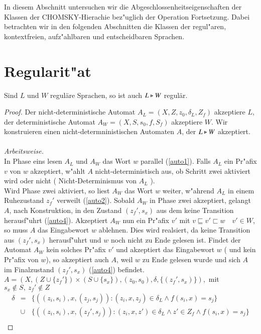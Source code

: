 In diesem Abschnitt untersuchen wir die Abgeschlossenheitseigenschaften der Klassen der CHOMSKY-Hierachie bez"uglich der Operation Fortsetzung. 
Dabei betrachten wir in den folgenden Abschnitten die Klassen der regul"aren, kontextfreien, aufz"ahlbaren und entscheidbaren Sprachen.

\section{Regularit"at}\label{abschnittreg}
\begin{satz}
Sind $L$ und $W$ regul\"are Sprachen, so ist auch $L\triangleright W$ regul\"ar.
\end{satz}
\begin{proof}
Der nicht-deterministische Automat $A_L= (X,Z,z_{0},\delta_L,Z_f)$ akzeptiere $L$, der deterministische Automat $A_W = (X,S,s_{0},f,S_{f})$ akzeptiere $W$.
Wir konstruieren einen nicht-determninistischen Automaten $A$, der $L\triangleright W$ akzeptiert.\\\\\emph{Arbeitsweise.}\\
In Phase eins lesen $A_L$ und $A_W$ das Wort $w$ parallel (\ref{auto1}). Falls $A_L$ ein Pr"afix $v$ von $w$ akzeptiert, w"ahlt $A$ nicht-deterministisch aus, ob Schritt zwei aktiviert wird oder nicht ( Nicht-Determinismus von $A_L$ ).\\
Wird Phase zwei aktiviert, so liest $A_W$ das Wort $w$ weiter, w"ahrend $A_L$ in einem Ruhezustand $z_f'$ verweilt (\ref{auto2}). Sobald $A_W$ in Phase zwei akzeptiert, gelangt $A$, nach Konstruktion, in den Zustand $(z_f',s_x)$ aus dem keine Transition herausf"uhrt (\ref{auto4}). Akzeptiert $A_W$ nun ein Pr"afix $v'$ mit $v\sqsubseteq v'\sqsubset w\quad v'\in W$, so muss $A$ das Eingabewort $w$ ablehnen. Dies wird realsiert, da keine Transition aus $(z_f',s_x)$ herausf"uhrt und $w$ noch nicht zu Ende gelesen ist. Findet der Automat $A_W$ kein solches Pr"afix $v'$ und akzeptiert das Eingabewort $w$ ( und kein Pr"afix von $w$), so akzeptiert auch $A$, weil $w$ zu Ende gelesen wurde und sich $A$ im Finalzustand $(z_f',s_x)$ (\ref{auto4}) befindet.
\\$A = (X,(Z\cup \{ z_f'\})\times (S\cup \{ s_x\}), (z_{0},s_{0}), \delta , \{ (z_f',s_x) \} ),$ mit $s_x\notin S,\ z_f'\notin Z$
\setcounter{equation}{0}
\begin{eqnarray}
 \delta &=&\{ ((z_i,s_i),x,(z_j,s_j)) : (z_i,x,z_j) \in \delta_L \wedge f(s_i,x)=s_j  \}  \label{auto1} \\
 & \cup & \{ ((z_i,s_i),x,(z_f',s_j)) : (z_i,x,z') \in \delta_L \wedge z'\in Z_f \wedge f(s_i,x)=s_j  \} \label{auto2}\\

\end{eqnarray}
\end{proof}
